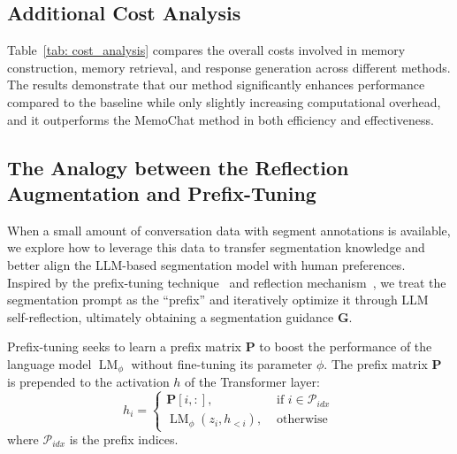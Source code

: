 \subsection{Additional Cost Analysis}
\label{sec: cost}


Table~\ref{tab: cost_analysis} compares the overall costs involved in memory construction, memory retrieval, and response generation across different methods. The results demonstrate that our method significantly enhances performance compared to the baseline while only slightly increasing computational overhead, and it outperforms the MemoChat method in both efficiency and effectiveness.


\subsection{The Analogy between the Reflection Augmentation and Prefix-Tuning}
When a small amount of conversation data with segment annotations is available, we explore how to leverage this data to transfer segmentation knowledge and better align the LLM-based segmentation model with human preferences. Inspired by the prefix-tuning technique~\citep{li2021prefix} and reflection mechanism~\citep{shinn2023reflexion,renze2024self}, we treat the segmentation prompt as the ``prefix'' and iteratively optimize it through LLM self-reflection, ultimately obtaining a segmentation guidance $\bm{G}$.

Prefix-tuning seeks to learn a prefix matrix $\bm{P}$ to boost the performance of the language model $\operatorname{LM}_{\phi}$ without fine-tuning its parameter $\phi$. The prefix matrix $\bm{P}$ is prepended to the activation $h$ of the Transformer layer: 
\begin{equation}
h_i= \begin{cases}\bm{P}[i,:], & \text { if } i \in \mathcal{P}_{idx} \\ \operatorname{LM}_\phi\left(z_i, h_{<i}\right), & \text { otherwise }\end{cases}
\end{equation}
where $\mathcal{P}_{idx}$ is the prefix indices.

